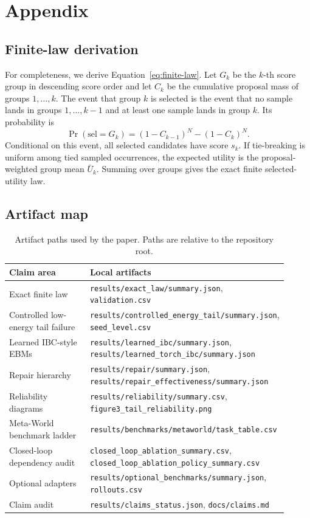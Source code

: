 \section{Appendix}

\subsection{Finite-law derivation}

For completeness, we derive Equation~\ref{eq:finite-law}. Let \(G_k\) be the \(k\)-th score group in descending score order and let \(C_k\) be the cumulative proposal mass of groups \(1,\ldots,k\). The event that group \(k\) is selected is the event that no sample lands in groups \(1,\ldots,k-1\) and at least one sample lands in group \(k\). Its probability is
\[
    \Pr(\mathrm{sel}=G_k) =
    (1-C_{k-1})^N - (1-C_k)^N .
\]
Conditional on this event, all selected candidates have score \(s_k\). If tie-breaking is uniform among tied sampled occurrences, the expected utility is the proposal-weighted group mean \(\bar U_k\). Summing over groups gives the exact finite selected-utility law.

\subsection{Artifact map}

\begin{table}[htbp]
\centering
\small
\setlength{\tabcolsep}{4pt}
\begin{tabular}{p{0.33\linewidth}p{0.58\linewidth}}
\toprule
Claim area & Local artifacts \\
\midrule
Exact finite law & \texttt{results/exact\_law/summary.json}, \texttt{validation.csv} \\
Controlled low-energy tail failure & \texttt{results/controlled\_energy\_tail/summary.json}, \texttt{seed\_level.csv} \\
Learned IBC-style EBMs & \texttt{results/learned\_ibc/summary.json}, \texttt{results/learned\_torch\_ibc/summary.json} \\
Repair hierarchy & \texttt{results/repair/summary.json}, \texttt{results/repair\_effectiveness/summary.json} \\
Reliability diagrams & \texttt{results/reliability/summary.csv}, \texttt{figure3\_tail\_reliability.png} \\
Meta-World benchmark ladder & \texttt{results/benchmarks/metaworld/task\_table.csv} \\
Closed-loop dependency audit & \texttt{closed\_loop\_ablation\_summary.csv}, \texttt{closed\_loop\_ablation\_policy\_summary.csv} \\
Optional adapters & \texttt{results/optional\_benchmarks/summary.json}, \texttt{rollouts.csv} \\
Claim audit & \texttt{results/claims\_status.json}, \texttt{docs/claims.md} \\
\bottomrule
\end{tabular}
\caption{Artifact paths used by the paper. Paths are relative to the repository root.}
\label{tab:artifact-map}
\end{table}

